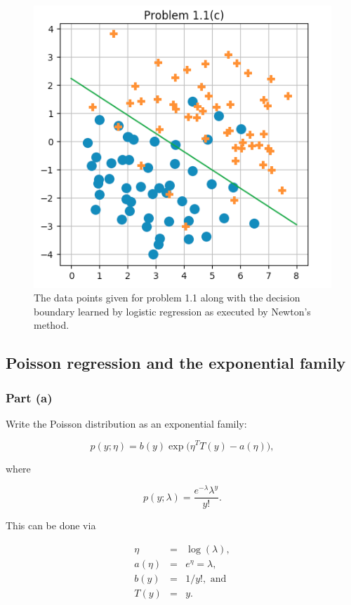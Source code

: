 \documentclass[]{article}
\begin{document}
\begin{figure}[htbp]
\centering
\includegraphics{images/pr1_1c.png}
\caption{The data points given for problem 1.1 along with the decision
boundary learned by logistic regression as executed by Newton's method.}
\end{figure}

\subsection{Poisson regression and the exponential
family}\label{poisson-regression-and-the-exponential-family}

\subsubsection{Part (a)}\label{part-a-1}

Write the Poisson distribution as an exponential family:

\[p(y;\eta) = b(y)\exp\big(\eta^T T(y) - a(\eta)\big),\]

where

\[p(y;\lambda) = \frac{e^{-\lambda}\lambda^y}{y!}.\]

This can be done via

\[\begin{array}{rcl}
\eta & = & \log(\lambda), \\
a(\eta) & = & e^\eta = \lambda, \\
b(y) & = & 1/y!, \text{ and} \\
T(y) & = & y.
\end{array}\]
\end{document}

